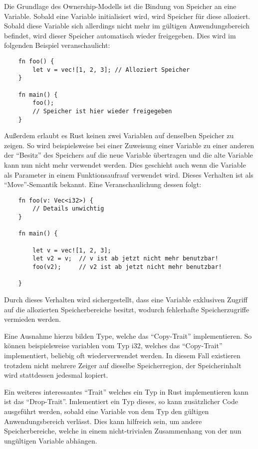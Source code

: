 Die Grundlage des Ownership-Modells ist die Bindung von Speicher an eine Variable. Sobald eine Variable initialisiert wird, 
wird Speicher für diese alloziert. Sobald diese Variable sich allerdings nicht mehr im gültigen Anwendungsbereich befindet,
wird dieser Speicher automatisch wieder freigegeben. Dies wird im folgenden Beispiel veranschaulicht:

\begin{verbatim}
    fn foo() {
        let v = vec![1, 2, 3]; // Alloziert Speicher
    }

    fn main() {
        foo();
        // Speicher ist hier wieder freigegeben
    } 
\end{verbatim}

Außerdem erlaubt es Rust keinen zwei Variablen auf denselben Speicher zu zeigen. So wird beispielsweise bei einer Zuweisung einer
Variable zu einer anderen der ``Besitz'' des Speichers auf die neue Variable übertragen und die alte Variable kann nun nicht mehr
verwendet werden. Dies geschieht auch wenn die Variable als Parameter in einem Funktionsaufrauf verwendet wird.
Dieses Verhalten ist als ``Move''-Semantik bekannt. Eine Veranschaulichung dessen folgt:

\begin{verbatim}
    fn foo(v: Vec<i32>) {
        // Details unwichtig
    }

    fn main() {
	
        let v = vec![1, 2, 3];
        let v2 = v;  // v ist ab jetzt nicht mehr benutzbar!
        foo(v2);     // v2 ist ab jetzt nicht mehr benutzbar!

    }
\end{verbatim}

Durch dieses Verhalten wird sichergestellt, dass eine Variable exklusiven Zugriff auf die allozierten Speicherbereiche besitzt,
wodurch fehlerhafte Speicherzugriffe vermieden werden.

Eine Ausnahme hierzu bilden Type, welche das ``Copy-Trait'' implementieren. So können beispielsweise variablen vom Typ i32, welches
das ``Copy-Trait'' implementiert, beliebig oft wiederverwendet werden. In diesem Fall existieren trotzdem nicht mehrere Zeiger
auf dieselbe Speicherregion, der Speicherinhalt wird stattdessen jedesmal kopiert.

Ein weiteres interessantes ``Trait'' welches ein Typ in Rust implementieren kann ist das ``Drop-Trait''. Imlementiert ein Typ dieses,
so kann zusätzlicher Code ausgeführt werden, sobald eine Variable von dem Typ den gültigen Anwendungsbereich verlässt. Dies kann
hilfreich sein, um andere Speicherbereiche, welche in einem nicht-trivialen Zusammenhang von der nun ungültigen Variable abhängen.


